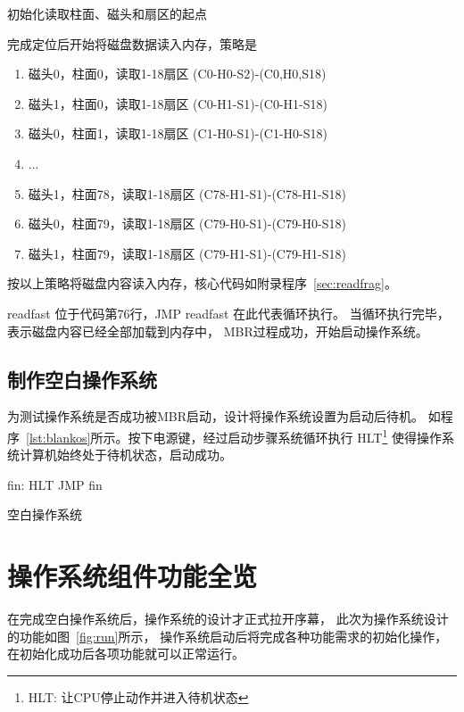 \begin{listing}[H]
  \begin{codeblock}[.5]
  \inputminted[tabsize=2, firstline=43, lastline=45,
  linenos=true]{nasm}{../ZOS/src/kernel/ipl09.nas}
  \end{codeblock}
  \caption{初始化读取柱面、磁头和扇区的起点}
  \label{lst:chs}
\end{listing}

完成定位后开始将磁盘数据读入内存，策略是
\begin{enumerate}
\item 磁头0，柱面0，读取1-18扇区 (C0-H0-S2)-(C0,H0,S18)
\item 磁头1，柱面0，读取1-18扇区 (C0-H1-S1)-(C0-H1-S18)
\item 磁头0，柱面1，读取1-18扇区 (C1-H0-S1)-(C1-H0-S18)
\item ...
\item 磁头1，柱面78，读取1-18扇区 (C78-H1-S1)-(C78-H1-S18)
\item 磁头0，柱面79，读取1-18扇区 (C79-H0-S1)-(C79-H0-S18)
\item 磁头1，柱面79，读取1-18扇区 (C79-H1-S1)-(C79-H1-S18)
\end{enumerate}

按以上策略将磁盘内容读入内存，核心代码如附录程序~\ref{sec:readfrag}。

readfast 位于代码第76行，JMP readfast 在此代表循环执行。
当循环执行完毕，表示磁盘内容已经全部加载到内存中，
MBR过程成功，开始启动操作系统。

\subsection{制作空白操作系统}

为测试操作系统是否成功被MBR启动，设计将操作系统设置为启动后待机。
如程序~\ref{lst:blankos}所示。按下电源键，经过启动步骤系统循环执行
HLT\footnote{HLT: 让CPU停止动作并进入待机状态\cite{30_osKawaiHidemi200630}}
使得操作系统计算机始终处于待机状态，启动成功。

\begin{listing}[H]
  \begin{codeblock}[.5]
    \begin{nasmcode}
      fin:
      HLT
      JMP fin
    \end{nasmcode}
  \end{codeblock}
  \caption{空白操作系统}
  \label{lst:blankos}
\end{listing}

\section{操作系统组件功能全览}
在完成空白操作系统后，操作系统的设计才正式拉开序幕，
此次为操作系统设计的功能如图~\ref{fig:run}所示，
操作系统启动后将完成各种功能需求的初始化操作，
在初始化成功后各项功能就可以正常运行。

